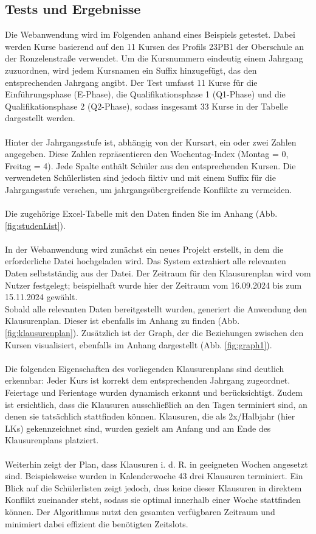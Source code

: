 \subsection{Tests und Ergebnisse}
Die Webanwendung wird im Folgenden anhand eines Beispiels getestet. Dabei werden Kurse basierend auf den 11 Kursen des Profils 23PB1 der Oberschule an der Ronzelenstraße verwendet. Um die Kursnummern eindeutig einem Jahrgang zuzuordnen, wird jedem Kursnamen ein Suffix hinzugefügt, das den entsprechenden Jahrgang angibt. Der Test umfasst 11 Kurse für die Einführungsphase (E-Phase), die Qualifikationsphase 1 (Q1-Phase) und die Qualifikationsphase 2 (Q2-Phase), sodass insgesamt 33 Kurse in der Tabelle dargestellt werden.\\\\
Hinter der Jahrgangsstufe ist, abhängig von der Kursart, ein oder zwei Zahlen angegeben. Diese Zahlen repräsentieren den Wochentag-Index (Montag = 0, Freitag = 4). Jede Spalte enthält Schüler aus den entsprechenden Kursen. Die verwendeten Schülerlisten sind jedoch fiktiv und mit einem Suffix für die Jahrgangsstufe versehen, um jahrgangsübergreifende Konflikte zu vermeiden.\\\\
Die zugehörige Excel-Tabelle mit den Daten finden Sie im Anhang (Abb. \ref{fig:studenList}).\\\\
In der Webanwendung wird zunächst ein neues Projekt erstellt, in dem die erforderliche Datei hochgeladen wird. Das System extrahiert alle relevanten Daten selbstständig aus der Datei. Der Zeitraum für den Klausurenplan wird vom Nutzer festgelegt; beispielhaft wurde hier der Zeitraum vom 16.09.2024 bis zum 15.11.2024 gewählt.\\
Sobald alle relevanten Daten bereitgestellt wurden, generiert die Anwendung den Klausurenplan. Dieser ist ebenfalls im Anhang zu finden (Abb. \ref{fig:klausurenplan}). Zusätzlich ist der Graph, der die Beziehungen zwischen den Kursen visualisiert, ebenfalls im Anhang dargestellt (Abb. \ref{fig:graph1}).\\\\
Die folgenden Eigenschaften des vorliegenden Klausurenplans sind deutlich erkennbar: Jeder Kurs ist korrekt dem entsprechenden Jahrgang zugeordnet. Feiertage und Ferientage wurden dynamisch erkannt und berücksichtigt. Zudem ist ersichtlich, dass die Klausuren ausschließlich an den Tagen terminiert sind, an denen sie tatsächlich stattfinden können. Klausuren, die als 2x/Halbjahr (hier LKs) gekennzeichnet sind, wurden gezielt am Anfang und am Ende des Klausurenplans platziert.\\\\
Weiterhin zeigt der Plan, dass Klausuren \acrshort{i. d. R.} in geeigneten Wochen angesetzt sind. Beispielsweise wurden in Kalenderwoche 43 drei Klausuren terminiert. Ein Blick auf die Schülerlisten zeigt jedoch, dass keine dieser Klausuren in direktem Konflikt zueinander steht, sodass sie optimal innerhalb einer Woche stattfinden können. Der Algorithmus nutzt den gesamten verfügbaren Zeitraum und minimiert dabei effizient die benötigten Zeitslots.